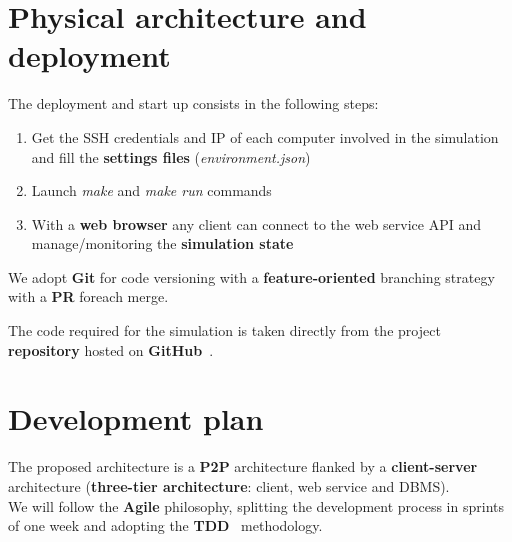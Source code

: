 \section{Physical architecture and deployment}

The deployment and start up consists in the following steps:
\begin{enumerate}
    \item Get the SSH credentials and IP of each computer involved in the simulation and 
        fill the \textbf{settings files} (\textit{environment.json})
    \item Launch \textit{make} and \textit{make run} commands 
    \item With a \textbf{web browser} any client can connect to the web service API and 
        manage/monitoring the \textbf{simulation state}   
\end{enumerate}

\noindent
We adopt \textbf{Git} for code versioning with a \textbf{feature-oriented} 
branching strategy with a \textbf{PR} foreach merge.

The code required for the simulation is taken directly from the project 
\textbf{repository} hosted on \textbf{GitHub}~\cite{2}.


\section{Development plan}

The proposed architecture is a \textbf{P2P} architecture flanked by a 
\textbf{client-server} architecture (\textbf{three-tier architecture}: 
client, web service and DBMS).\\

We will follow the \textbf{Agile} philosophy, splitting the development process in sprints 
of one week and adopting the \textbf{TDD}~\cite{10} methodology.
